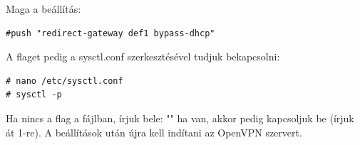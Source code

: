Maga a beállítás:
\begin{verbatim}
#push "redirect-gateway def1 bypass-dhcp"
\end{verbatim}

A  flaget pedig a sysctl.conf szerkesztésével tudjuk bekapcsolni:
\begin{verbatim}
# nano /etc/sysctl.conf
# sysctl -p
\end{verbatim}
Ha nincs a flag a fájlban, írjuk bele: "" ha van, akkor pedig kapcsoljuk be (írjuk át 1-re). A beállítások után újra kell indítani az OpenVPN szervert.


